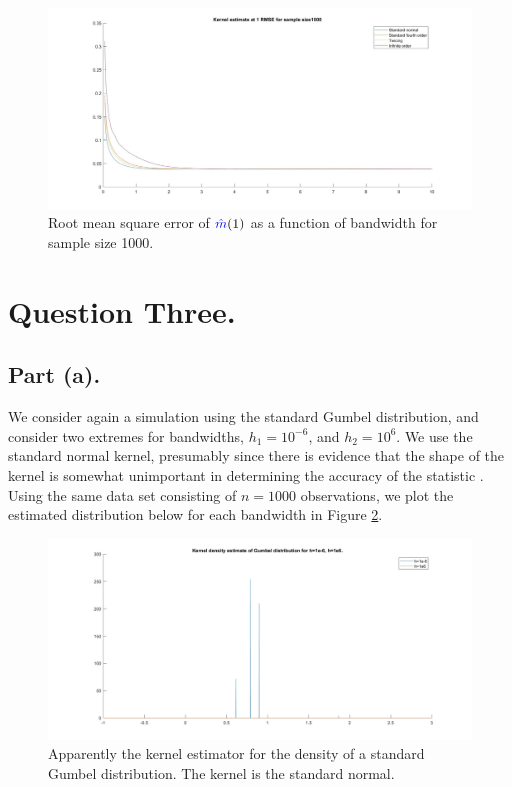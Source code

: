 \documentclass{article}
\renewcommand{\r}[1]{\textcolor{blue}{#1}}
\begin{document}
\begin{center}
\begin{figure}
\centering
\includegraphics[width=13cm]{q2rmse1000m.jpg}
\caption{Root mean square error of $\r{\hat{m}}(1)$ as a function of bandwidth for sample size 1000.}
\label{fig:2rmse1000m}
\end{figure} 
\end{center}



\section{Question Three.}
\subsection{Part (a).}
We consider again a simulation using the standard Gumbel distribution, and consider two extremes for bandwidths, $h_{1}=10^{-6}$, and $h_{2}=10^{6}$. We use the standard normal kernel, presumably since there is evidence that the shape of the kernel is somewhat unimportant in determining the accuracy of the statistic \cite{trapp2012}. Using the same data set consisting of $n=1000$ observations, we plot the estimated distribution below for each bandwidth in Figure \ref{fig:q3d}.

\begin{center}
\begin{figure}
\centering
\includegraphics[width=13cm]{q3density.jpg}
\caption{Apparently the kernel estimator for the density of a standard Gumbel distribution. The kernel is the standard normal.}
\label{fig:q3d}
\end{figure} 
\end{center}
\end{document}

